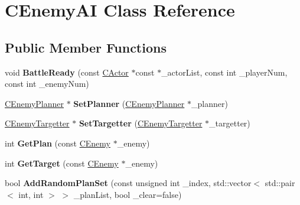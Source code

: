 \hypertarget{class_c_enemy_a_i}{}\section{C\+Enemy\+AI Class Reference}
\label{class_c_enemy_a_i}
\subsection*{Public Member Functions}
\begin{DoxyCompactItemize}
\item 
void {\bfseries Battle\+Ready} (const \hyperlink{class_c_actor}{C\+Actor} $\ast$const $\ast$\+\_\+actor\+List, const int \+\_\+player\+Num, const int \+\_\+enemy\+Num)\hypertarget{class_c_enemy_a_i_a686edd0c9def3e9e3d15db2875bc5e38}{}\label{class_c_enemy_a_i_a686edd0c9def3e9e3d15db2875bc5e38}

\item 
\hyperlink{class_c_enemy_planner}{C\+Enemy\+Planner} $\ast$ {\bfseries Set\+Planner} (\hyperlink{class_c_enemy_planner}{C\+Enemy\+Planner} $\ast$\+\_\+planner)\hypertarget{class_c_enemy_a_i_a1937e173f5e4de133e22a0b17bac3dd2}{}\label{class_c_enemy_a_i_a1937e173f5e4de133e22a0b17bac3dd2}

\item 
\hyperlink{class_c_enemy_targetter}{C\+Enemy\+Targetter} $\ast$ {\bfseries Set\+Targetter} (\hyperlink{class_c_enemy_targetter}{C\+Enemy\+Targetter} $\ast$\+\_\+targetter)\hypertarget{class_c_enemy_a_i_a7c0d802bc98c57d8fea078b7b7dd99f6}{}\label{class_c_enemy_a_i_a7c0d802bc98c57d8fea078b7b7dd99f6}

\item 
int {\bfseries Get\+Plan} (const \hyperlink{class_c_enemy}{C\+Enemy} $\ast$\+\_\+enemy)\hypertarget{class_c_enemy_a_i_a90f7d5697813517710f20412d1ca0634}{}\label{class_c_enemy_a_i_a90f7d5697813517710f20412d1ca0634}

\item 
int {\bfseries Get\+Target} (const \hyperlink{class_c_enemy}{C\+Enemy} $\ast$\+\_\+enemy)\hypertarget{class_c_enemy_a_i_a54bada58d6cf91bbfb54deaf86c4218b}{}\label{class_c_enemy_a_i_a54bada58d6cf91bbfb54deaf86c4218b}

\item 
bool {\bfseries Add\+Random\+Plan\+Set} (const unsigned int \+\_\+index, std\+::vector$<$ std\+::pair$<$ int, int $>$ $>$ \+\_\+plan\+List, bool \+\_\+clear=false)\hypertarget{class_c_enemy_a_i_ad538577e56076a3d43bdee2235e5083a}{}\label{class_c_enemy_a_i_ad538577e56076a3d43bdee2235e5083a}


\end{DoxyCompactItemize}

